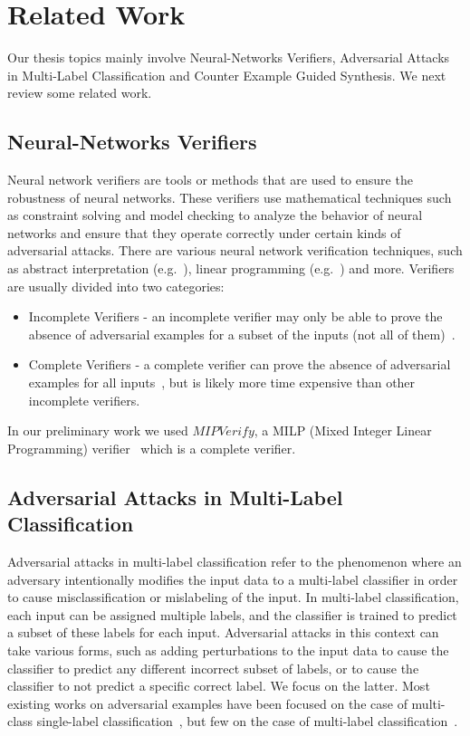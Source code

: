 
\section{Related Work}
Our thesis topics mainly involve Neural-Networks Verifiers, Adversarial Attacks in Multi-Label Classification and Counter Example Guided Synthesis.
We next review some related work.
\subsection{Neural-Networks Verifiers}
Neural network verifiers are tools or methods that are used to ensure the robustness of neural networks.
These verifiers use mathematical techniques such as constraint solving and model checking to analyze the behavior of neural networks and ensure that they operate correctly under certain kinds of adversarial attacks.
There are various neural network verification techniques, such as abstract interpretation (e.g.~\cite{ABSTRACTINTER, INCOMPLETE1}), linear programming (e.g.~\cite{MIPVERIFY}) and more.
Verifiers are usually divided into two categories:
\begin{itemize}
    \item Incomplete Verifiers - an incomplete verifier may only be able to prove the absence of adversarial examples for a subset of the inputs (not all of them)~\cite{INCOMPLETE1, INCOMPLETE2}.
    \item Complete Verifiers - a complete verifier can prove the absence of adversarial examples for all inputs~\cite{MIPVERIFY, COMPLETE}, but is likely more time expensive than other incomplete verifiers.
\end{itemize}
In our preliminary work we used $MIPVerify$, a MILP (Mixed Integer Linear Programming) verifier~\cite{MIPVERIFY} which is a complete verifier.

\subsection{Adversarial Attacks in Multi-Label Classification}
Adversarial attacks in multi-label classification refer to the phenomenon where an adversary intentionally modifies the input data to a multi-label classifier in order to cause misclassification or mislabeling of the input.
In multi-label classification, each input can be assigned multiple labels, and the classifier is trained to predict a subset of these labels for each input.
Adversarial attacks in this context can take various forms, such as adding perturbations to the input data to cause the classifier to predict any different incorrect subset of labels, or to cause the classifier to not predict a specific correct label.
We focus on the latter.
Most existing works on adversarial examples have been focused on the case of multi-class single-label classification~\cite{SINGLElABEL1, SINGLElABEL2, SINGLElABEL3, SINGLElABEL4}, but few on the case of multi-label classification~\cite{MULTIlABEL}.

